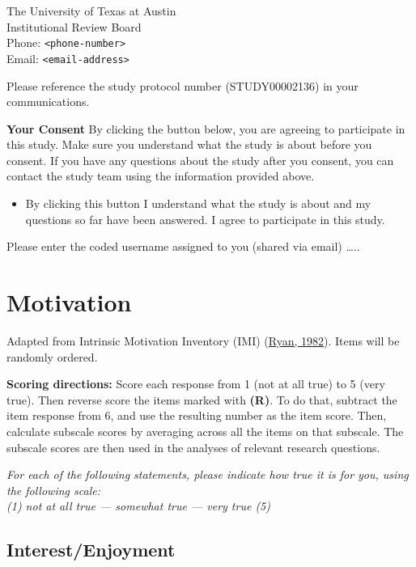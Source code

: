 \documentclass[letterpaper, nobind]{templates/ociamthesis}
\providecommand{\tightlist}{%
  \setlength{\itemsep}{0pt}\setlength{\parskip}{0pt}}
\begin{document}
The University of Texas at Austin\\
Institutional Review Board\\
Phone: \texttt{\textless{}phone-number\textgreater{}}\\
Email: \texttt{\textless{}email-address\textgreater{}}

Please reference the study protocol number (STUDY00002136) in your communications.

\textbf{Your Consent}
By clicking the button below, you are agreeing to participate in this study. Make sure you understand what the study is about before you consent. If you have any questions about the study after you consent, you can contact the study team using the information provided above.

\begin{itemize}
\tightlist
\item
  By clicking this button I understand what the study is about and my questions so far have been answered. I agree to participate in this study.
\end{itemize}

Please enter the coded username assigned to you (shared via email) \ldots..

\hypertarget{app-qsnr-imi}{%
\section{Motivation}\label{app-qsnr-imi}}

Adapted from Intrinsic Motivation Inventory (IMI) (\protect\hyperlink{ref-ryan1982control}{Ryan, 1982}).
Items will be randomly ordered.

\textbf{Scoring directions:}
Score each response from 1 (not at all true) to 5 (very true).
Then reverse score the items marked with \textbf{(R)}.
To do that, subtract the item response from 6, and use the resulting number as the item score.
Then, calculate subscale scores by averaging across all the items on that subscale.
The subscale scores are then used in the analyses of relevant research questions.

\emph{For each of the following statements, please indicate how true it is
for you, using the following scale:}\\
\emph{(1) not at all true --- somewhat true --- very true (5)}

\hypertarget{interestenjoyment}{%
\subsection{Interest/Enjoyment}\label{interestenjoyment}}
\end{document}
